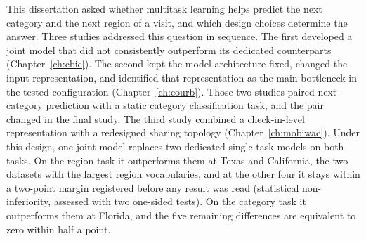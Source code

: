 This dissertation asked whether multitask learning helps predict the next category and
the next region of a visit, and which design choices determine the answer. Three studies
addressed this question in sequence. The first developed a joint model that did not
consistently outperform its dedicated counterparts (Chapter~\ref{ch:cbic}). The second
kept the model architecture fixed, changed the input representation, and identified that
representation as the main bottleneck in the tested configuration
(Chapter~\ref{ch:courb}). Those two studies paired next-category prediction with a static
category classification task, and the pair changed in the final study.
The third study combined a check-in-level representation with a redesigned sharing
topology (Chapter~\ref{ch:mobiwac}). Under this design, one joint model replaces two
dedicated single-task models on both tasks. On the region task it outperforms
them at Texas and California, the two datasets with the largest region vocabularies, and at
the other four it stays within a two-point margin registered before any result was read
(statistical non-inferiority, assessed with two one-sided tests). On the category task it
outperforms them at Florida, and the five remaining differences are equivalent to zero within
half a point.


